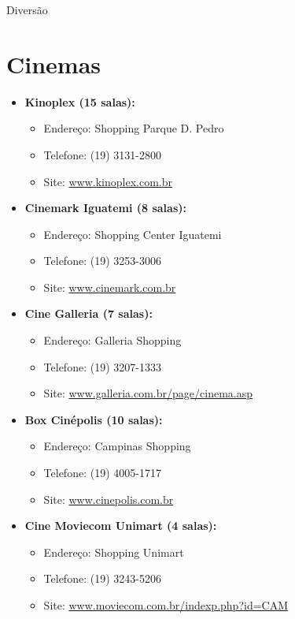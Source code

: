 \begin{story}{Diversão}
\begin{itemize}
\end{itemize}

\section*{Cinemas}

\begin{itemize}

\item \textbf{Kinoplex (15 salas):}
\begin{itemize}
\item Endereço: Shopping Parque D. Pedro
\item Telefone: (19) 3131-2800
\item Site: \url{www.kinoplex.com.br} 
\end{itemize}

\item \textbf{Cinemark Iguatemi (8 salas):}
\begin{itemize}
\item Endereço: Shopping Center Iguatemi
\item Telefone: (19) 3253-3006
\item Site: \url{www.cinemark.com.br}
\end{itemize}

\item \textbf{Cine Galleria (7 salas):}
\begin{itemize}
\item Endereço: Galleria Shopping
\item Telefone: (19) 3207-1333
\item Site: \url{www.galleria.com.br/page/cinema.asp} 
\end{itemize}

\item \textbf{Box Cinépolis (10 salas):}
\begin{itemize}
\item Endereço: Campinas Shopping
\item Telefone: (19) 4005-1717
\item Site: \url{www.cinepolis.com.br}
\end{itemize}

\item \textbf{Cine Moviecom Unimart (4 salas):}
\begin{itemize}
\item Endereço: Shopping Unimart
\item Telefone: (19) 3243-5206
\item Site: \url{www.moviecom.com.br/indexp.php?id=CAM} 
\end{itemize}


\end{itemize}
\end{story}
